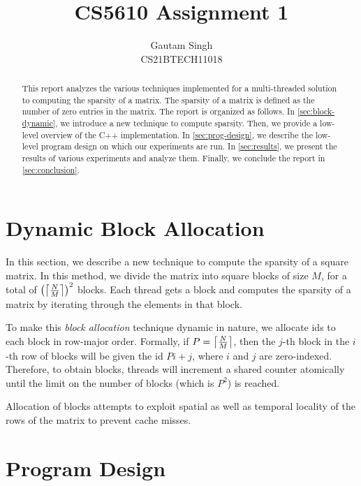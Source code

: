 \documentclass[conference,compsoc]{IEEEtran}
\begin{document}
\vspace{3cm}
\title{CS5610 Assignment 1}
\author{Gautam Singh\\CS21BTECH11018}
\maketitle
\tableofcontents

\bigskip

\begin{abstract}
    This report analyzes the various techniques implemented for a multi-threaded
    solution to computing the sparsity of a matrix. The sparsity of a matrix is
    defined as the number of zero entries in the matrix. The report is organized
    as follows. In \autoref{sec:block-dynamic}, we introduce a new technique to
    compute sparsity. Then, we provide a low-level overview of the C++
    implementation. In \autoref{sec:prog-design}, we describe the low-level
    program design on which our experiments are run. In \autoref{sec:results},
    we present the results of various experiments and analyze them. Finally, we
    conclude the report in \autoref{sec:conclusion}.  
\end{abstract}

\section{Dynamic Block Allocation}
\label{sec:block-dynamic}

In this section, we describe a new technique to compute the sparsity of a square
matrix. In this method, we divide the matrix into square blocks of size \(M\),
for a total of \(\left(\left\lceil\frac{N}{M}\right\rceil\right)^2\) blocks. Each thread gets a block
and computes the sparsity of a matrix by iterating through the elements in that
block.

To make this \emph{block allocation} technique dynamic in nature, we allocate
ids to each block in row-major order. Formally, if \(P = \left\lceil\frac{N}{M}\right\rceil\),
then the \(j\)-th block in the \(i\)-th row of blocks will be given the id \(Pi
+ j\), where \(i\) and \(j\) are zero-indexed. Therefore, to obtain blocks,
threads will increment a shared counter atomically until the limit on the number
of blocks (which is \(P^2\)) is reached.

Allocation of blocks attempts to exploit spatial as well as temporal locality of
the rows of the matrix to prevent cache misses.

\section{Program Design}
\label{sec:prog-design}
\end{document}
